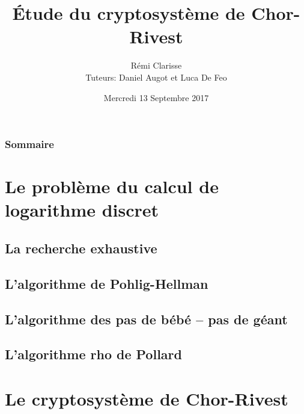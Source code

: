 \documentclass{beamer}
\title{Étude du cryptosystème de Chor-Rivest}
\author{Rémi {Clarisse} \\ Tuteurs: Daniel {Augot} et Luca {De Feo}}
\institute{ INRIA Saclay--Île-de-France \\ Université de Bordeaux}
\date{Mercredi 13 Septembre 2017}
\theoremstyle{definition}
\theoremstyle{remark}
\begin{document}
\begin{frame}[plain]
	\titlepage
\end{frame}

\begin{frame}
	\frametitle{Sommaire}
  	\tableofcontents
\end{frame} 

\section{Le problème du calcul de logarithme discret}
\subsection{La recherche exhaustive}
\begin{frame}
	\frametitle{}
  	
\end{frame} 

\subsection{L'algorithme de Pohlig-Hellman}
\begin{frame}
	\frametitle{}
  	
\end{frame} 

\subsection{L'algorithme des pas de bébé -- pas de géant}
\begin{frame}
	\frametitle{}
  	
\end{frame} 

\subsection{L'algorithme rho de Pollard}
\begin{frame}
	\frametitle{}
  	
\end{frame}

\section{Le cryptosystème de Chor-Rivest}
\begin{frame}
	\frametitle{}
  	
\end{frame} 
\end{document}
